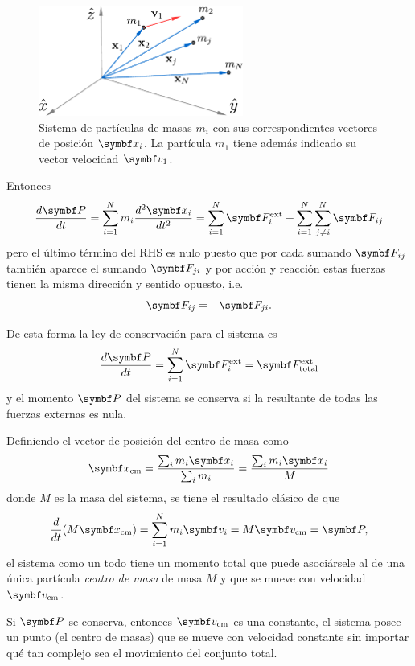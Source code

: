 \documentclass[10pt,oneside]{CBFT_book}
\begin{document}
\begin{figure}[hbt]
	\begin{center}
	\includegraphics[width=0.6\textwidth]{images/fig_mc_leyes_cons.pdf}
	\end{center}
	\caption{Sistema de partículas de masas $m_i$ con sus correspondientes vectores de
	posición $\vb{x}_i$. La partícula $m_1$ tiene además indicado su vector velocidad $\vb{v}_1$.}
	\label{fig_mc_leyes_cons}
\end{figure} 

Entonces 
\[
	\dtot{\vb{P}}{t} = \Sum{i=1}{N} m_i \dtot[2]{\vb{x}_i}{t} = \Sum{i=1}{N} \vb{F}_i^\text{ext} + 
	\Sum{i=1}{N} \Sum{ j \neq i }{N} \vb{F}_{ij}
\]
pero el último término del RHS es nulo puesto que por cada sumando $ \vb{F}_{ij} $ también aparece el sumando 
$ \vb{F}_{ji} $ y por acción y reacción estas fuerzas tienen la misma dirección y sentido opuesto, i.e.
\[
	\vb{F}_{ij} = - \vb{F}_{ji}.
\]

De esta forma la ley de conservación para el sistema es 
\[
	\dtot{\vb{P}}{t} = \Sum{i=1}{N} \vb{F}_i^\text{ext} = \vb{F}^\text{ext}_\text{total}
\]
y el momento $ \vb{P} $ del sistema se conserva si la resultante de todas las fuerzas externas es nula. 

Definiendo el vector de posición del centro de masa como 
\[
	\vb{x}_\text{cm} = \frac{\sum_i m_i \vb{x}_i }{\sum_i m_i} = \frac{\sum_i m_i \vb{x}_i }{M}
\]
donde $ M $ es la masa del sistema, se tiene el resultado clásico de que
\[
	\dtot{}{t}( M \vb{x}_\text{cm} ) = \Sum{i=1}{N} m_i \vb{v}_i = M \vb{v}_\text{cm} = \vb{P},
\]
el sistema como un todo tiene un momento total que puede asociársele al de una única partícula {\it centro de masa} de 
masa $M$ y que se mueve con velocidad $ \vb{v}_\text{cm} $.

Si $\vb{P}$ se conserva, entonces $ \vb{v}_\text{cm} $ es una constante, el sistema posee un punto (el centro de masas) 
que se mueve con velocidad constante sin importar qué tan complejo sea el movimiento del conjunto total.

\end{document}
